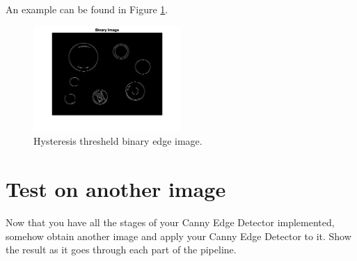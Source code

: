 \documentclass[12pt]{article}
\begin{document}
\noindent
An example can be found in Figure \ref{fig4}.

\begin{figure}[H]
\begin{center}
\includegraphics[width=0.5\textwidth]{hysteresis.png}
\caption{Hysteresis thresheld binary edge image.}
\label{fig4}
\end{center}
\end{figure}

\newpage
\section{Test on another image}
Now that you have all the stages of your Canny Edge Detector implemented, somehow obtain another image and apply your Canny Edge Detector to it.  Show the result as it goes through each part of the pipeline.\\
\end{document}
